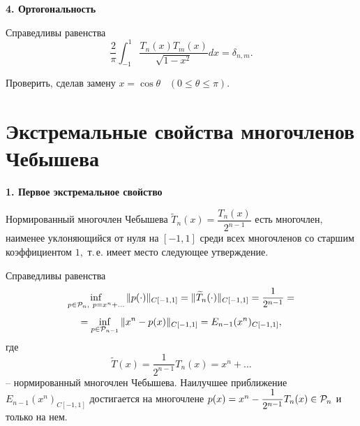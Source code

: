 \vspace{3mm}
{\bf 4. Ортогональность}
\vspace{3mm}

{Справедливы равенства}
\[
{\frac{2}{\pi}} \int_{-1}^1 \frac{T_n(x)T_m(x)}{\sqrt{1-x^2}}dx={\delta_{n,m}}.
\]

\begin{ex}
{Проверить, сделав замену $x=\cos{\theta}$~ $(0 \le \theta \le \pi)$.}
\end{ex}

\section{Экстремальные свойства многочленов Чебышева}

{\bf 1. Первое экстремальное свойство}
\vspace{3mm}

Нормированный многочлен Чебышева $\widetilde T_n(x)=\dfrac{T_n(x)}{2^{n-1}}$ есть многочлен, наименее уклоняющийся от нуля на $[-1,1]$ среди
всех многочленов со старшим коэффициентом $1,$ т.\,е. имеет место {следующее утверждение.}

\begin{teo} \label{teo1extsvo}
Справедливы равенства
$$
\inf_{p \in \mathcal{P}_n,\ p =x^n+\dots} \|p(\cdot )\|_{C[-1,1]} =
            \|\widetilde T_n(\cdot )\|_{C[-1,1]}=\frac{1}{2^{n-1}}=
$$
$$
=\inf_{p \in \mathcal{P}_{n-1}} \|x^n-p(x)\|_{C[-1,1]}= E_{n-1}(x^n)_{C[-1,1]},
$$
где $$\widetilde T(x)=\dfrac{1}{2^{n-1}}T_n(x)=x^n+\dots$$ -- нормированный
многочлен Чебышева. Наилучшее приближение
$E_{n-1}(x^n)_{C[-1,1]}$ достигается на
многочлене $p(x)=x^n-\dfrac{1}{2^{n-1}}T_n(x)\in {\cal P}_n$ {и только на нем}.
\end{teo}

